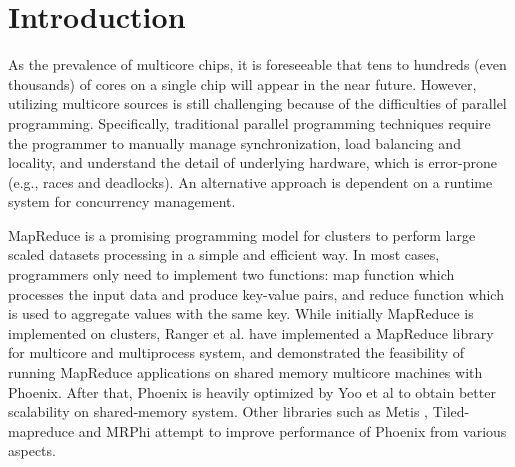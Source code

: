 \section{Introduction}
\label{sec:intro}



As the prevalence of multicore chips, it is foreseeable that tens to hundreds (even thousands) of cores on a single chip will appear in the near future\cite{Borkar2007core}.
However, utilizing multicore sources is still challenging because of the difficulties of parallel programming.
Specifically, traditional parallel programming techniques require the programmer to manually manage synchronization, load balancing and locality, and understand the detail  of underlying hardware, which is error-prone (e.g., races and deadlocks). %
An alternative approach is dependent on a runtime system for concurrency management. 

MapReduce\cite{dean2004mapreduce} is a promising programming model for clusters to perform large scaled datasets processing in a simple and efficient way.
In most cases, programmers only need to implement two functions: 
map function which processes the input data and produce key-value pairs, and reduce function which is used to aggregate values with the same key.
While initially MapReduce is implemented on clusters, Ranger et al. have implemented a MapReduce library for multicore and multiprocess system, and demonstrated the feasibility of running MapReduce applications on shared memory multicore machines with Phoenix\cite{ranger2007phoenix}.
After that, Phoenix is heavily optimized by Yoo et al\cite{yoo2009phoenix2} to obtain better scalability on shared-memory system.
Other libraries such as Metis\cite{mao2010metis} , Tiled-mapreduce\cite{chen2010tiled} and MRPhi\cite{lu2013mrphi} attempt to improve performance of Phoenix from various aspects.


